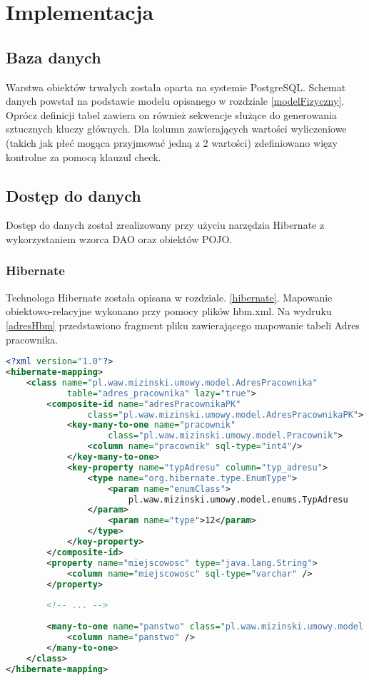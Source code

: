 \chapter{Implementacja}
\label{chap6}

\section{Baza danych}
Warstwa obiektów trwałych została oparta na systemie PostgreSQL. Schemat danych powstał na podstawie modelu opisanego w rozdziale \ref{modelFizyczny}. Oprócz definicji tabel zawiera on również sekwencje służące do generowania sztucznych kluczy głównych. Dla kolumn zawierających wartości wyliczeniowe (takich jak płeć mogąca przyjmować jedną z 2 wartości) zdefiniowano więzy kontrolne za pomocą klauzul check.

\section{Dostęp do danych}
Dostęp do danych został zrealizowany przy użyciu narzędzia Hibernate z wykorzystaniem wzorca DAO oraz obiektów POJO.

\subsection[Hibernate][Hibernate]{Hibernate} 
Technologa Hibernate została opisana w rozdziale. \ref{hibernate}. Mapowanie obiektowo-relacyjne wykonano przy pomocy plików hbm.xml. Na wydruku \ref{adresHbm} przedstawiono fragment pliku zawierającego mapowanie tabeli Adres pracownika.

\begin{lstlisting}[language=XML,style=outcode,showstringspaces=false, caption=Mapowanie tabeli Adres pracownika w postaci pliku hbm.xml,label={adresHbm}]
<?xml version="1.0"?>
<hibernate-mapping>
	<class name="pl.waw.mizinski.umowy.model.AdresPracownika"
			table="adres_pracownika" lazy="true">
		<composite-id name="adresPracownikaPK" 
				class="pl.waw.mizinski.umowy.model.AdresPracownikaPK">
			<key-many-to-one name="pracownik" 
					class="pl.waw.mizinski.umowy.model.Pracownik">
				<column name="pracownik" sql-type="int4"/>
			</key-many-to-one>
			<key-property name="typAdresu" column="typ_adresu">
				<type name="org.hibernate.type.EnumType">
					<param name="enumClass">
						pl.waw.mizinski.umowy.model.enums.TypAdresu
				</param>
					<param name="type">12</param>
				</type>
			</key-property>
		</composite-id>
		<property name="miejscowosc" type="java.lang.String">
			<column name="miejscowosc" sql-type="varchar" />
		</property>
		
		<!-- ... -->
		
		<many-to-one name="panstwo" class="pl.waw.mizinski.umowy.model.Panstwo">
			<column name="panstwo" />
		</many-to-one>
	</class>
</hibernate-mapping>
\end{lstlisting}

